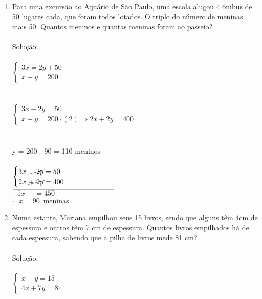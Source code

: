 \documentclass[a4paper,14pt]{article}
\begin{document}
\begin{multicols}{2}
\begin{enumerate}
        \item Para uma excursão ao Aquário de São Paulo, uma escola alugou 4 ônibus de 50 lugares cada, que foram todos lotados. O triplo do número de meninas mais 50. Quantos meninos e quantas meninas foram ao passeio?\\\\
        Solução: \\\\
        $\begin{cases}
        	3x = 2y + 50 \\
        	x + y = 200 
        \end{cases}$ \\\\\\
        $\begin{cases}
        	3x - 2y = 50 \\
        	x + y = 200 \cdot (2) \Rightarrow 2x + 2y = 400 
        \end{cases}$ \\\\\\
        y = 200 - 90 = 110 meninos \\\\
        $\begin{cases}
        	3x~\cancel{-~2y} = 50 \\
        	2x~\cancel{+~2y} = 400
        \end{cases}$ \\
        $
        \underline{\hspace{5cm}} \\
        $ \\
        $\cdot~~5x ~~~~~~= 450$ \\
        $\cdot~~~x = 90$~meninas
        \item Numa estante, Mariana empilhou seus 15 livros, sendo que alguns têm 4cm de espessura e outros têm 7 cm de espessura. Quantos livros empilhados há de cada espessura, sabendo que a pilha de livros mede 81 cm? \\\\
        Solução: \\\\
        $\begin{cases}
        	x + y = 15 \\
        	4x + 7y = 81
        \end{cases}$ \\
        

\end{enumerate}
\end{multicols}
\end{document}
